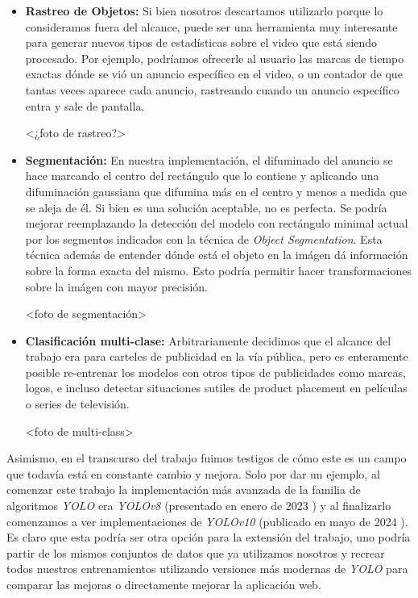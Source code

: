\documentclass[a4paper]{article}
\begin{document}
\begin{itemize}
\item \textbf{Rastreo de Objetos:} Si bien nosotros descartamos utilizarlo porque lo consideramos fuera del alcance, puede ser una herramienta muy interesante para generar nuevos tipos de estadísticas sobre el video que está siendo procesado. Por ejemplo, podríamos ofrecerle al usuario las marcas de tiempo exactas dónde se vió un anuncio específico en el video, o un contador de que tantas veces aparece cada anuncio, rastreando cuando un anuncio específico entra y sale de pantalla.


<¿foto de rastreo?>

\item \textbf{Segmentación:} En nuestra implementación, el difuminado del anuncio se hace marcando el centro del rectángulo que lo contiene y aplicando una difuminación gaussiana que difumina más en el centro y menos a medida que se aleja de él. Si bien es una solución aceptable, no es perfecta. Se podría mejorar reemplazando la detección del modelo con rectángulo minimal actual por los segmentos indicados con la técnica de \textit{Object Segmentation}. Esta técnica además de entender dónde está el objeto en la imágen dá información sobre la forma exacta del mismo. Esto podría permitir hacer transformaciones sobre la imágen con mayor precisión.

<foto de segmentación>

\item \textbf{Clasificación multi-clase:} Arbitrariamente decidimos que el alcance del trabajo era para carteles de publicidad en la vía pública, pero es enteramente posible re-entrenar los modelos con otros tipos de publicidades como marcas, logos, e incluso detectar situaciones sutiles de product placement en películas o series de televisión.

<foto de multi-class>
\end{itemize}

Asimismo, en el transcurso del trabajo fuimos testigos de cómo este es un campo que todavía está en constante cambio y mejora. Solo por dar un ejemplo, al comenzar este trabajo la implementación más avanzada de la familia de algoritmos \textit{YOLO} era \textit{YOLOv8} (presentado en enero de 2023 \cite{yolov8}) y al finalizarlo comenzamos a ver implementaciones de \textit{YOLOv10} (publicado en mayo de 2024 \cite{yolov10}). Es claro que esta podría ser otra opción para la extensión del trabajo, uno podría partir de los mismos conjuntos de datos que ya utilizamos nosotros y recrear todos nuestros entrenamientos utilizando versiones más modernas de \textit{YOLO} para comparar las mejoras o directamente mejorar la aplicación web. \\
\end{document}
